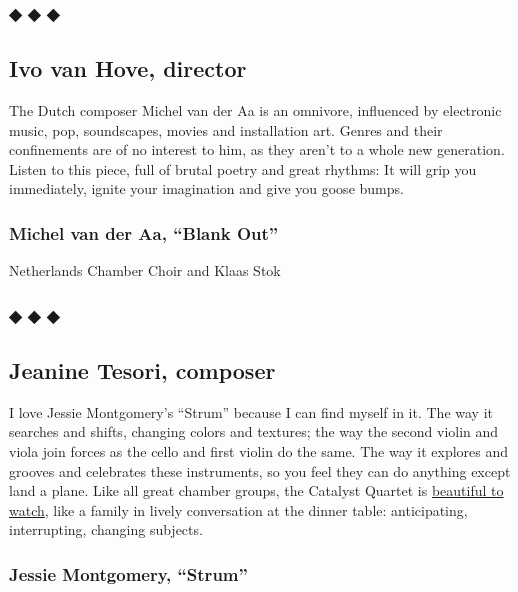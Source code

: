 \hypertarget{---1}{%
\subsubsection{◆ ◆ ◆}\label{---1}}

\hypertarget{ivo-van-hove-director}{%
\subsection{Ivo van Hove, director}\label{ivo-van-hove-director}}

The Dutch composer Michel van der Aa is an omnivore, influenced by
electronic music, pop, soundscapes, movies and installation art. Genres
and their confinements are of no interest to him, as they aren't to a
whole new generation. Listen to this piece, full of brutal poetry and
great rhythms: It will grip you immediately, ignite your imagination and
give you goose bumps.

\hypertarget{michel-van-der-aa-blank-out}{%
\subsubsection{Michel van der Aa, ``Blank
Out''}\label{michel-van-der-aa-blank-out}}

Netherlands Chamber Choir and Klaas Stok

\hypertarget{---2}{%
\subsubsection{◆ ◆ ◆}\label{---2}}

\hypertarget{jeanine-tesori-composer}{%
\subsection{Jeanine Tesori, composer}\label{jeanine-tesori-composer}}

I love Jessie Montgomery's ``Strum'' because I can find myself in it.
The way it searches and shifts, changing colors and textures; the way
the second violin and viola join forces as the cello and first violin do
the same. The way it explores and grooves and celebrates these
instruments, so you feel they can do anything except land a plane. Like
all great chamber groups, the Catalyst Quartet is
\href{https://youtu.be/qnLE9ygdwrU}{beautiful to watch}, like a family
in lively conversation at the dinner table: anticipating, interrupting,
changing subjects.

\hypertarget{jessie-montgomery-strum}{%
\subsubsection{Jessie Montgomery,
``Strum''}\label{jessie-montgomery-strum}}

